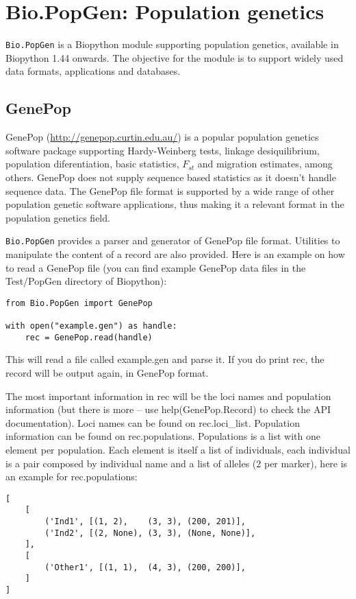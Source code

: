 \chapter{Bio.PopGen: Population genetics}

\verb|Bio.PopGen| is a Biopython module supporting population genetics,
available in Biopython 1.44 onwards. The objective for the module is to
support widely used data formats, applications and databases.

\section{GenePop}

GenePop (\url{http://genepop.curtin.edu.au/}) is a popular population
genetics software package supporting Hardy-Weinberg tests, linkage
desiquilibrium, population diferentiation, basic statistics, $F_{st}$ and
migration estimates, among others. GenePop does not supply sequence
based statistics as it doesn't handle sequence data.
The GenePop file format is supported by a wide range of other population
genetic software applications, thus making it a relevant format in the
population genetics field.

\verb|Bio.PopGen| provides a parser and generator of GenePop file format.
Utilities to manipulate the content of a record are also provided.
Here is an example on how to read a GenePop file (you can find
example GenePop data files in the Test/PopGen directory of Biopython):

\begin{verbatim}
from Bio.PopGen import GenePop

with open("example.gen") as handle:
    rec = GenePop.read(handle)
\end{verbatim}

This will read a file called example.gen and parse it. If you
do print rec, the record will be output again, in GenePop format.

The most important information in rec will be the loci names and
population information (but there is more -- use help(GenePop.Record)
to check the API documentation). Loci names can be found on rec.loci\_list.
Population information can be found on rec.populations.
Populations is a list with one element per population. Each element is itself
a list of individuals, each individual is a pair composed by individual
name and a list of alleles (2 per marker), here is an example for
rec.populations:

\begin{verbatim}
[
    [
        ('Ind1', [(1, 2),    (3, 3), (200, 201)],
        ('Ind2', [(2, None), (3, 3), (None, None)],
    ],
    [
        ('Other1', [(1, 1),  (4, 3), (200, 200)],
    ]
]
\end{verbatim}

